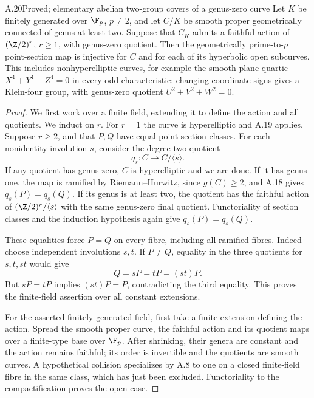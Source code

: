 \begin{claim}{A.20}{Proved; elementary abelian two-group covers of a genus-zero curve}
Let $K$ be finitely generated over $\F_p$, $p\ne2$, and let
$C/K$ be smooth proper geometrically connected of genus at
least two. Suppose that $C_{\overline K}$ admits a faithful
action of $(\Z/2)^r$, $r\ge1$, with genus-zero quotient.
Then the geometrically prime-to-$p$ point-section map is
injective for $C$ and for each of its hyperbolic open
subcurves. This includes nonhyperelliptic curves, for example
the smooth plane quartic $X^4+Y^4+Z^4=0$ in every odd
characteristic: changing coordinate signs gives a Klein-four
group, with genus-zero quotient $U^2+V^2+W^2=0$.
\end{claim}
\begin{proof}
We first work over a finite field, extending it to define the
action and all quotients. We induct on $r$. For $r=1$ the
curve is hyperelliptic and A.19 applies. Suppose $r\ge2$,
and that $P,Q$ have equal point-section classes. For each
nonidentity involution $s$, consider the degree-two quotient
\[
 q_s:C\longrightarrow C/\langle s\rangle.
\]
If any quotient has genus zero, $C$ is hyperelliptic and we
are done. If it has genus one, the map is ramified by
Riemann--Hurwitz, since $g(C)\ge2$, and A.18 gives
$q_s(P)=q_s(Q)$. If its genus is at least two, the quotient
has the faithful action of
$(\Z/2)^r/\langle s\rangle$ with the same genus-zero final
quotient. Functoriality of section classes and the induction
hypothesis again give $q_s(P)=q_s(Q)$.

These equalities force $P=Q$ on every fibre, including all
ramified fibres. Indeed choose independent involutions $s,t$.
If $P\ne Q$, equality in the three quotients for $s,t,st$
would give
\[
 Q=sP=tP=(st)P.
\]
But $sP=tP$ implies $(st)P=P$, contradicting the third
equality. This proves the finite-field assertion over all
constant extensions.

For the asserted finitely generated field, first take a
finite extension defining the action. Spread the smooth
proper curve, the faithful action and its quotient maps over
a finite-type base over $\F_p$. After shrinking, their genera
are constant and the action remains faithful; its order is
invertible and the quotients are smooth curves. A hypothetical
collision specializes by A.8 to one on a closed finite-field
fibre in the same class, which has just been excluded.
Functoriality to the compactification proves the open case.
\end{proof}


